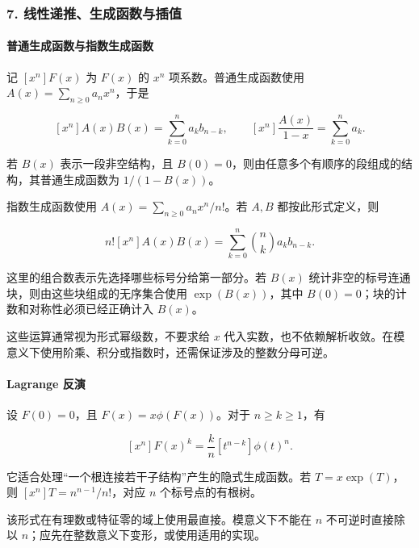 \hypertarget{ux7ebfux6027ux9012ux63a8ux751fux6210ux51fdux6570ux4e0eux63d2ux503c}{%
\subsubsection{7. 线性递推、生成函数与插值}\label{ux7ebfux6027ux9012ux63a8ux751fux6210ux51fdux6570ux4e0eux63d2ux503c}}

\hypertarget{ux666eux901aux751fux6210ux51fdux6570ux4e0eux6307ux6570ux751fux6210ux51fdux6570}{%
\paragraph{普通生成函数与指数生成函数}\label{ux666eux901aux751fux6210ux51fdux6570ux4e0eux6307ux6570ux751fux6210ux51fdux6570}}

记 \([x^n]F(x)\) 为 \(F(x)\) 的 \(x^n\) 项系数。普通生成函数使用 \(A(x)=\sum_{n\ge0}a_nx^n\)，于是

\[
[x^n]A(x)B(x)=\sum_{k=0}^{n}a_kb_{n-k},\qquad
[x^n]\frac{A(x)}{1-x}=\sum_{k=0}^{n}a_k.
\]

若 \(B(x)\) 表示一段非空结构，且 \(B(0)=0\)，则由任意多个有顺序的段组成的结构，其普通生成函数为 \(1/(1-B(x))\)。

指数生成函数使用 \(A(x)=\sum_{n\ge0}a_nx^n/n!\)。若 \(A,B\) 都按此形式定义，则

\[
n![x^n]A(x)B(x)=\sum_{k=0}^{n}\binom{n}{k}a_kb_{n-k}.
\]

这里的组合数表示先选择哪些标号分给第一部分。若 \(B(x)\) 统计非空的标号连通块，则由这些块组成的无序集合使用 \(\exp(B(x))\)，其中 \(B(0)=0\)；块的计数和对称性必须已经正确计入 \(B(x)\)。

这些运算通常视为形式幂级数，不要求给 \(x\) 代入实数，也不依赖解析收敛。在模意义下使用阶乘、积分或指数时，还需保证涉及的整数分母可逆。

\hypertarget{lagrange-ux53cdux6f14}{%
\paragraph{Lagrange 反演}\label{lagrange-ux53cdux6f14}}

设 \(F(0)=0\)，且 \(F(x)=x\phi(F(x))\)。对于 \(n\ge k\ge1\)，有

\[
[x^n]F(x)^k=\frac{k}{n}[t^{n-k}]\phi(t)^n.
\]

它适合处理``一个根连接若干子结构''产生的隐式生成函数。若 \(T=x\exp(T)\)，则 \([x^n]T=n^{n-1}/n!\)，对应 \(n\) 个标号点的有根树。

该形式在有理数或特征零的域上使用最直接。模意义下不能在 \(n\) 不可逆时直接除以 \(n\)；应先在整数意义下变形，或使用适用的实现。


